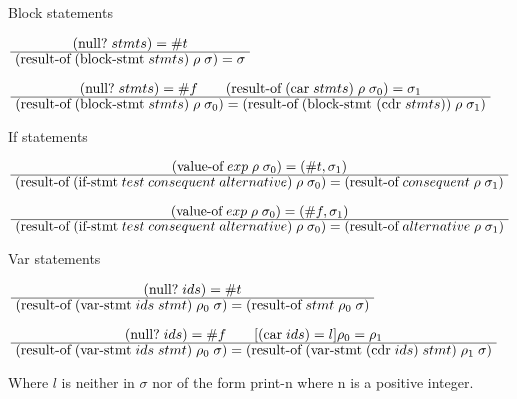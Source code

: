 \documentclass[12pt]{article}
\begin{document}
{\setlength{\parindent}{0px}

\vspace{25px}
Block statements

\vspace{10px}
$\IR{\
  (\textrm{null?}\;stmts) = \#t\
}{\
  \ROE{(\textrm{block-stmt}\;stmts)}{}{}{}{}\
}$

\vspace{10px}
$\IR{\
  (\textrm{null?}\;stmts) = \#f\qquad\ROE{(\textrm{car}\;stmts)}{}{_0}{}{_1}\
}{\
  \RO{(\textrm{block-stmt}\;stmts)}{}{_0}=\RO{(\textrm{block-stmt (cdr}\;stmts))}{}{_1}\
}$

\vspace{100px}
If statements

\vspace{10px}
$\IR{\
  \VOE{exp}{}{_0}{\#t}{_1}\
}{\
  \RO{(\textrm{if-stmt}\;test\;consequent\;alternative)}{}{_0} = \RO{consequent}{}{_1}\
}$

\vspace{10px}
$\IR{\
  \VOE{exp}{}{_0}{\#f}{_1}\
}{\
  \RO{(\textrm{if-stmt}\;test\;consequent\;alternative)}{}{_0} = \RO{alternative}{}{_1}\
}$

\vspace{25px}
Var statements

\vspace{10px}
$\IR{\
  (\textrm{null?}\;ids) = \#t\
}{\
  \RO{(\textrm{var-stmt}\;ids\;stmt)}{_0}{} = \RO{stmt}{_0}{}\
}$

\vspace{10px}
$\IR{\
  (\textrm{null?}\;ids) = \#f\qquad[(\textrm{car}\;ids)=l]\rho_0 = \rho_1\
}{\
  \RO{(\textrm{var-stmt}\;ids\;stmt)}{_0}{} = \RO{(\textrm{var-stmt}\;(\textrm{cdr}\;ids)\;stmt)}{_1}{}\
}$
}

\vspace{5px}
Where $l$ is neither in $\sigma$ nor of the form print-n where n is a positive integer.
\end{document}

